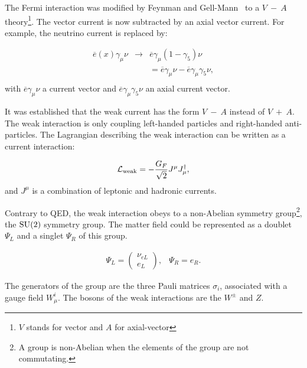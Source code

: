    The Fermi interaction was modified by Feynman and Gell-Mann~\cite{PhysRev.109.193} to a $V~-~A$ theory\footnote{$V$ stands for vector and $A$ for axial-vector}.
    The vector current is now subtracted by an axial vector current. 
    For example, the neutrino current is replaced by:

    \begin{equation}
        \begin{array}{rcc}
        \overline{e}(x) \gamma_{\mu} \nu & \rightarrow & \overline{e}\gamma_{\mu}(1 - \gamma_5 ) \nu \\
            & & = \overline{e} \gamma_{\mu} \nu - \overline{e}\gamma_{\mu} \gamma_5 \nu, \\
        \end{array}
    \end{equation}
    with $\overline{e} \gamma_{\mu} \nu$ a current vector and $\overline{e}\gamma_{\mu} \gamma_5 \nu$ an axial current vector.

    It was established that the weak current has the form $V~-~A$ instead of $V~+~A$.
    The weak interaction is only coupling left-handed particles and right-handed anti-particles.
    The Lagrangian describing the weak interaction can be written as a current interaction:

    \begin{equation}
      \mathcal{L}_{\rm{weak}} = - \frac{G_F}{\sqrt{2}} J^{\mu}J_{\mu}^{\dagger},
    \end{equation}
     and $J^{\mu}$ is a combination of leptonic and hadronic currents.

    Contrary to \gls{QED}, the weak interaction obeys to a non-Abelian symmetry group\footnote{A group is non-Abelian when the elements of the group are not commutating.}, the $\rm{SU}(2)$ symmetry group.
    The matter field could be represented as a doublet $\Psi_L$ and a singlet $\Psi_R$ of this group.

    \begin{equation}
      \begin{array}{cc}
        \Psi_L = 
         \begin{pmatrix}
           \nu_{eL} \\
           e_L
         \end{pmatrix}, & \Psi_R = e_R.
      \end{array}
    \end{equation}

    The generators of the group are the three Pauli matrices $\sigma_i$, associated with a gauge field $W_{\mu}^i$.
    The bosons of the weak interactions are the $W^{\pm}$ and $Z$.

